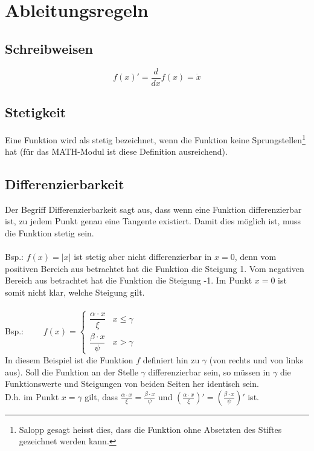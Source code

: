 \section{Ableitungsregeln}

\subsection{Schreibweisen}
\[ \boxed{f(x)' = \frac{d}{dx} f(x) = \dot{x}} \]

\subsection{Stetigkeit}
Eine Funktion wird als stetig bezeichnet, wenn die Funktion keine 
Sprungstellen\footnote{Salopp gesagt heisst dies, dass die Funktion ohne Absetzten des Stiftes gezeichnet werden kann.}
hat (für das MATH-Modul ist diese Definition ausreichend).

\subsection{Differenzierbarkeit}
Der Begriff Differenzierbarkeit sagt aus, dass wenn eine Funktion
differenzierbar ist, zu jedem Punkt genau eine Tangente existiert. 
Damit dies möglich ist, muss die Funktion stetig sein.\\\\
Bsp.: $f(x)=|x|$ ist stetig aber nicht differenzierbar in $x=0$, 
denn vom positiven Bereich aus betrachtet hat die Funktion die Steigung 1.
Vom negativen Bereich aus betrachtet hat die Funktion die Steigung -1. 
Im Punkt $x=0$ ist somit nicht klar, welche Steigung gilt.\\\\
Bsp.: 
$ \quad \quad f(x) = \left\lbrace 
\begin{array}{ll}
	\dfrac{\alpha \cdot x}{\xi} & x \leq \gamma \\
	\dfrac{\beta \cdot x}{\psi}  & x > \gamma 
\end{array} \right.  $ \\
In diesem Beispiel ist die Funktion $f$ definiert hin zu $\gamma$ 
(von rechts und von links aus).
Soll die Funktion an der Stelle $\gamma$ differenzierbar sein, 
so müssen in $\gamma$ die Funktionswerte und Steigungen von beiden Seiten her
identisch sein. \\
D.h. im Punkt $x=\gamma$ gilt, dass 
$\frac{\alpha \cdot x}{\xi} = \frac{\beta \cdot x}{\psi}$ und
$\left(\frac{\alpha \cdot x}{\xi}\right)' = 
 \left(\frac{\beta \cdot x}{\psi} \right)'$ ist.

